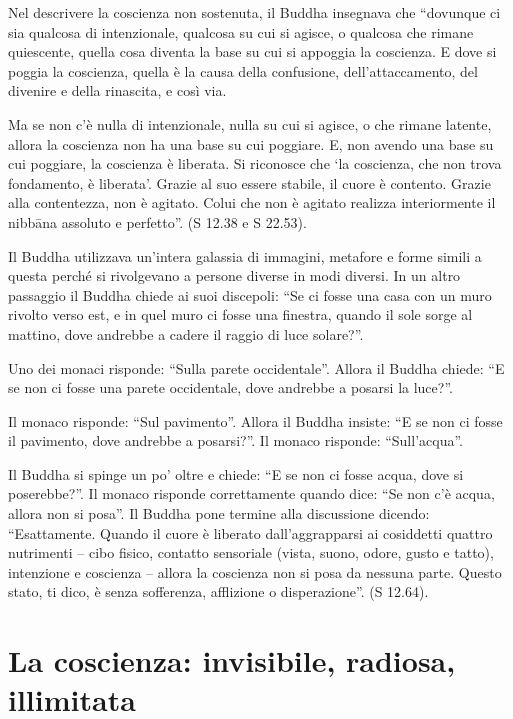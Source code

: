 Nel descrivere la coscienza non sostenuta, il Buddha insegnava che ``dovunque ci sia qualcosa di intenzionale, qualcosa su cui si agisce, o qualcosa che rimane quiescente, quella cosa diventa la base su cui si appoggia la coscienza. E dove si poggia la coscienza, quella è la causa della confusione, dell'attaccamento, del divenire e della rinascita, e così via.

Ma se non c'è nulla di intenzionale, nulla su cui si agisce, o che rimane latente, allora la coscienza non ha una base su cui poggiare. E, non avendo una base su cui poggiare, la coscienza è liberata. Si riconosce che `la coscienza, che non trova fondamento, è liberata'. Grazie al suo essere stabile, il cuore è contento. Grazie alla contentezza, non è agitato. Colui che non è agitato realizza interiormente il nibbāna assoluto e perfetto''. (S 12.38 e S 22.53). 

Il Buddha utilizzava un'intera galassia di immagini, metafore e forme simili a questa perché si rivolgevano a persone diverse in modi diversi. In un altro passaggio il Buddha chiede ai suoi discepoli: ``Se ci fosse una casa con un muro rivolto verso est, e in quel muro ci fosse una finestra, quando il sole sorge al mattino, dove andrebbe a cadere il raggio di luce solare?''. 

Uno dei monaci risponde: ``Sulla parete occidentale''. Allora il Buddha chiede: ``E se non ci fosse una parete occidentale, dove andrebbe a posarsi la luce?''.

Il monaco risponde: ``Sul pavimento''. Allora il Buddha insiste: ``E se non ci fosse il pavimento, dove andrebbe a posarsi?''. Il monaco risponde: ``Sull'acqua''. 

Il Buddha si spinge un po' oltre e chiede: ``E se non ci fosse acqua, dove si poserebbe?''. Il monaco risponde correttamente quando dice: ``Se non c'è acqua, allora non si posa''. Il Buddha pone termine alla discussione dicendo: ``Esattamente. Quando il cuore è liberato dall'aggrapparsi ai cosiddetti quattro nutrimenti – cibo fisico, contatto sensoriale (vista, suono, odore, gusto e tatto), intenzione e coscienza – allora la coscienza non si posa da nessuna parte. Questo stato, ti dico, è senza sofferenza, afflizione o disperazione''. (S 12.64). 

\section*{La coscienza: invisibile, radiosa, illimitata}

